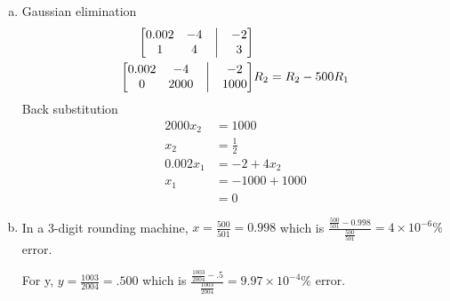 \documentclass[12pt, letterpaper]{article}
\begin{document}
\begin{enumerate}
\begin{enumerate}[(a)]
\begin{align*}
                    &= \frac{399}{401}\ \text{or}\ 0.995
                \end{align*}
            \item Gaussian elimination
                \begin{align*}
                    \begin{bmatrix}
                        0.002 &  -4 &  \bigm| & -2\\
                            1 &   4 &  \bigm| & 3 
                    \end{bmatrix}& \\
                    \begin{bmatrix}
                        0.002 &  -4 &  \bigm| & -2\\
                            0 & 2000 &  \bigm| & 1000 
                    \end{bmatrix}& R_2 = R_2 - 500R_1\\
                \end{align*}
                Back substitution
                \begin{align*}
                    2000x_2 &= 1000 \\
                    x_2 &= \frac12 \\
                    0.002x_1 &= -2 + 4x_2 \\
                    x_1 &= -1000 + 1000 \\
                    &= 0
                \end{align*}
            \item In a 3-digit rounding machine, $x = \frac{500}{501}=0.998$ which is $\frac{\frac{500}{501}-0.998}{\frac{500}{501}}=4\times10^{-6}\%$ error.
            
            For y, $y = \frac{1003}{2004}= .500 $ which is $\frac{\frac{1003}{2004}-.5}{\frac{1003}{2004}}=9.97 \times 10^{-4}\%$ error.


\end{enumerate}
\end{enumerate}
\end{document}
